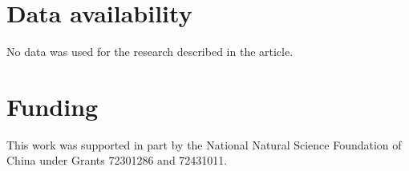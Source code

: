 \documentclass[final,3p,times]{elsarticle}
\begin{document}
\section*{Data availability}
No data was used for the research described in the article.
\section*{Funding}
This work was supported in part by the National Natural Science Foundation of China under Grants 72301286 and 72431011.




\appendix
\end{document}
